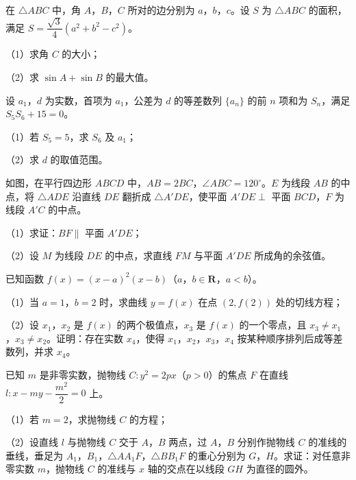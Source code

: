 \endgroup
{}
\begin{question}
在 $\triangle ABC$ 中，角 $A$，$B$，$C$ 所对的边分别为 $a$，$b$，$c$。设 $S$ 为 $\triangle ABC$ 的面积，满足 $S=\dfrac{\sqrt3}{4}(a^2+b^2-c^2)$。

（1）求角 $C$ 的大小；

（2）求 $\sin A+\sin B$ 的最大值。

\end{question}
\begin{question}
设 $a_1$，$d$ 为实数，首项为 $a_1$，公差为 $d$ 的等差数列 $\{a_n\}$ 的前 $n$ 项和为 $S_n$，满足 $S_5S_6+15=0$。

（1）若 $S_5=5$，求 $S_6$ 及 $a_1$；

（2）求 $d$ 的取值范围。

\Needspace{0.4\textheight}
\end{question}
\begingroup
\renewenvironment{question}{\Needspace{0.5\textheight}}{}
\begin{question}
如图，在平行四边形 $ABCD$ 中，$AB=2BC$，$\angle ABC=120^\circ$。$E$ 为线段 $AB$ 的中点，将 $\triangle ADE$ 沿直线 $DE$ 翻折成 $\triangle A'DE$，使平面 $A'DE\perp$ 平面 $BCD$，$F$ 为线段 $A'C$ 的中点。

（1）求证：$BF\parallel$ 平面 $A'DE$；

（2）设 $M$ 为线段 $DE$ 的中点，求直线 $FM$ 与平面 $A'DE$ 所成角的余弦值。
\nopagebreak[4]
\begin{center}\end{center}
\nopagebreak[4]
\end{question}
\endgroup
\begin{question}
已知函数 $f(x)=(x-a)^2(x-b)$（$a$，$b\in\mathbf R$，$a<b$）。

（1）当 $a=1$，$b=2$ 时，求曲线 $y=f(x)$ 在点 $(2,f(2))$ 处的切线方程；

（2）设 $x_1$，$x_2$ 是 $f(x)$ 的两个极值点，$x_3$ 是 $f(x)$ 的一个零点，且 $x_3\neq x_1$，$x_3\neq x_2$。证明：存在实数 $x_4$，使得 $x_1$，$x_2$，$x_3$，$x_4$ 按某种顺序排列后成等差数列，并求 $x_4$。

\Needspace{0.4\textheight}
\end{question}
\begingroup
\renewenvironment{question}{\Needspace{0.5\textheight}}{}
\begin{question}
已知 $m$ 是非零实数，抛物线 $C:y^2=2px$（$p>0$）的焦点 $F$ 在直线 $l:x-my-\dfrac{m^2}{2}=0$ 上。

（1）若 $m=2$，求抛物线 $C$ 的方程；

（2）设直线 $l$ 与抛物线 $C$ 交于 $A$，$B$ 两点，过 $A$，$B$ 分别作抛物线 $C$ 的准线的垂线，垂足为 $A_1$，$B_1$，$\triangle AA_1F$，$\triangle BB_1F$ 的重心分别为 $G$，$H$。求证：对任意非零实数 $m$，抛物线 $C$ 的准线与 $x$ 轴的交点在以线段 $GH$ 为直径的圆外。
\nopagebreak[4]
\begin{center}\end{center}
\nopagebreak[4]

\end{question}
\endgroup